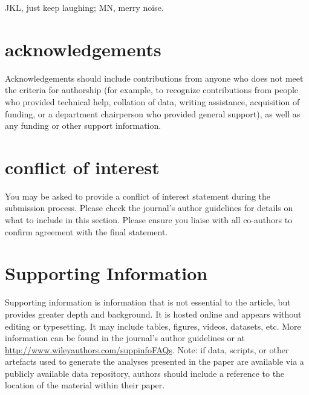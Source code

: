 \begin{table}[bt]
\begin{threeparttable}
              \begin{tablenotes}
                     \item JKL, just keep laughing; MN, merry noise.
              \end{tablenotes}
       \end{threeparttable}
\end{table}

\section*{acknowledgements}
Acknowledgements should include \cite{urmson2008autonomous} contributions from anyone who does not meet the criteria for authorship (for example, to recognize contributions from people who provided technical help, collation of data, writing assistance, acquisition of funding, or a department chairperson who provided general support), as well as any funding or other support information.

\section*{conflict of interest}
You may be asked to provide a conflict of interest statement during the submission process. Please check the journal's author guidelines for details on what to include in this section. Please ensure you liaise with all co-authors to confirm agreement with the final statement.

\section*{Supporting Information}

Supporting information is information that is not essential to the article, but provides greater depth and background. It is hosted online and appears without editing or typesetting. It may include tables, figures, videos, datasets, etc. More information can be found in the journal's author guidelines or at \url{http://www.wileyauthors.com/suppinfoFAQs}. Note: if data, scripts, or other artefacts used to generate the analyses presented in the paper are available via a publicly available data repository, authors should include a reference to the location of the material within their paper.
